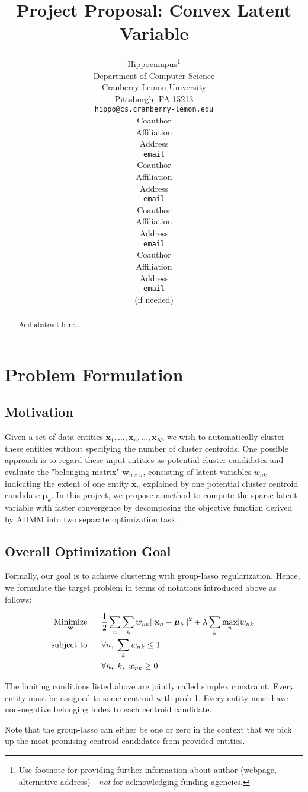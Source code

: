 \documentclass{article} %
\title{Project Proposal: Convex Latent Variable}
\author{
Hippocampus\thanks{ Use footnote for providing further information
about author (webpage, alternative address)---\emph{not} for acknowledging
funding agencies.} \\
Department of Computer Science\\
Cranberry-Lemon University\\
Pittsburgh, PA 15213 \\
\texttt{hippo@cs.cranberry-lemon.edu} \\
\And
Coauthor \\
Affiliation \\
Address \\
\texttt{email} \\
\AND
Coauthor \\
Affiliation \\
Address \\
\texttt{email} \\
\And
Coauthor \\
Affiliation \\
Address \\
\texttt{email} \\
\And
Coauthor \\
Affiliation \\
Address \\
\texttt{email} \\
(if needed)\\
}
\newcommand{\LTwoNorm}[1]{||#1||^{2}}
\newcommand{\sumn}{\sum_{n}}
\newcommand{\sumk}{\sum_{k}}
\newcommand{\wnk}{w_{nk}}
\newcommand{\w}{\mathbf{w}}
\newcommand{\wnbyn}{\mathbf{w}_{n\times n}}
\newcommand{\x}[1]{\mathbf{x}_{#1}}
\newcommand{\xn}{\mathbf{x}_n}
\newcommand{\muk}{\boldsymbol{\mu}_k}
\newcommand{\maxn}{ \underset{n}{\text{max}} }
\newcommand{\minimize}[1]{ \underset{#1}{\text{Minimize}} }
\newcommand{\subjectto}{ \text{subject to} }
\newcommand{\hs}{\hspace*{0.6cm}}
\begin{document}
\maketitle

\begin{abstract}
    Add abstract here..
\end{abstract}

\section{Problem Formulation}
\subsection{Motivation}
Given a set of data entities $\x{1}, ..., \xn, ..., \x{N} $, we wish to
automatically cluster these entities without specifying the number of cluster
centroids. One possible approach is to regard these input entities as
potential cluster candidates and evaluate the "belonging matrix" $\wnbyn$, consisting
of latent variables $\wnk$ indicating the extent of one entity $\xn$ explained
by one potential cluster centroid candidate $\muk$. In this project, we
propose a method to compute the sparse latent variable with faster
convergence by decomposing the objective function derived by ADMM into two
separate optimization task.


\subsection{Overall Optimization Goal}
Formally, our goal is to achieve clustering with group-lasso regularization.
Hence, we formulate the target problem in terms of notations introduced above
as follows:

 \begin{align}
  \minimize{\w}
  \hs & \frac{1}{2} \sumn \sumk \wnk \LTwoNorm{\xn - \muk}  %
        + \lambda \sumk \maxn | \wnk |  \\ %
  \subjectto
  \hs & \forall n,\ \sumk \wnk \leq 1 \\
  \hs & \forall n,\ k,\ \wnk \geq 0
 \end{align}

The limiting conditions listed above are jointly called simplex constraint.
Every entity must be assigned to some centroid with prob 1.
Every entity must have non-negative belonging index to each centroid candidate.

Note that the group-lasso can either be one or zero in the context that we
pick up the most promising centroid candidates from provided entities.
\end{document}
